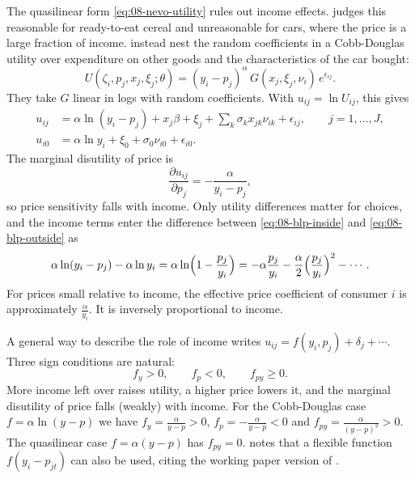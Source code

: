 The quasilinear form \eqref{eq:08-nevo-utility} rules out income effects. \citet[p.~518]{Nevo2000a} judges
this reasonable for ready-to-eat cereal and unreasonable for cars, where the price is a large fraction of
income. \citet[eq.~(2.6)]{BerryLevinsohnPakes1995} instead nest the random coefficients in a Cobb-Douglas
utility over expenditure on other goods and the characteristics of the car bought:
\begin{equation}\label{eq:08-cobb-douglas}
  U(\zeta_i, p_j, x_j, \xi_j; \theta) = (y_i - p_j)^\alpha\, G(x_j, \xi_j, \nu_i)\, e^{\epsilon_{ij}}.
\end{equation}
They take $G$ linear in logs with random coefficients. With $u_{ij} = \ln U_{ij}$, this gives
\citep[eqs.~(2.7a), (2.7b)]{BerryLevinsohnPakes1995}
\begin{align}
  u_{ij} &= \alpha \ln(y_i - p_j) + x_j\beta + \xi_j + \sum_k \sigma_k x_{jk}\nu_{ik} + \epsilon_{ij},
          \qquad j = 1, \dots, J, \label{eq:08-blp-inside}\\
  u_{i0} &= \alpha \ln y_i + \xi_0 + \sigma_0\nu_{i0} + \epsilon_{i0}. \label{eq:08-blp-outside}
\end{align}
The marginal disutility of price is
\begin{equation}\label{eq:08-blp-dudp}
  \frac{\partial u_{ij}}{\partial p_j} = -\frac{\alpha}{y_i - p_j},
\end{equation}
so price sensitivity falls with income. Only utility differences matter for choices, and the income terms
enter the difference between \eqref{eq:08-blp-inside} and \eqref{eq:08-blp-outside} as
\begin{equation*}
  \alpha\ln(y_i - p_j) - \alpha \ln y_i = \alpha \ln\Bigl(1 - \frac{p_j}{y_i}\Bigr)
  = -\alpha\frac{p_j}{y_i} - \frac{\alpha}{2}\Bigl(\frac{p_j}{y_i}\Bigr)^2 - \cdots .
\end{equation*}
For prices small relative to income, the effective price coefficient of consumer $i$ is approximately
$\frac{\alpha}{y_i}$. It is inversely proportional to income.

A general way to describe the role of income writes $u_{ij} = f(y_i, p_j) + \delta_j + \cdots$. Three sign
conditions are natural:
\begin{equation}\label{eq:08-f-signs}
  f_y > 0, \qquad f_p < 0, \qquad f_{py} \ge 0.
\end{equation}
More income left over raises utility, a higher price lowers it, and the marginal disutility of price falls
(weakly) with income. For the Cobb-Douglas case $f = \alpha\ln(y - p)$ we have $f_y = \frac{\alpha}{y - p} >
0$, $f_p = -\frac{\alpha}{y-p} < 0$ and $f_{py} = \frac{\alpha}{(y-p)^2} > 0$. The quasilinear case $f =
\alpha(y - p)$ has $f_{py} = 0$. \citet[p.~518]{Nevo2000a} notes that a flexible function $f(y_i - p_{jt})$
can also be used, citing the working paper version of \citet{Petrin2002}.

